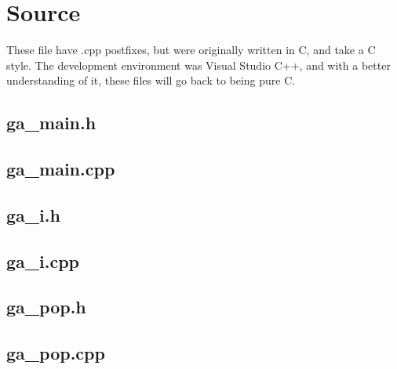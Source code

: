 \section{Source}
These file have .cpp postfixes, but were originally written in C, and take
a C style. The development environment was Visual Studio C++, and with a 
better understanding of it, these files will go back to being pure C.

\subsection{ga\_main.h}


\subsection{ga\_main.cpp}


\subsection{ga\_i.h}


\subsection{ga\_i.cpp}


\subsection{ga\_pop.h}


\subsection{ga\_pop.cpp}

